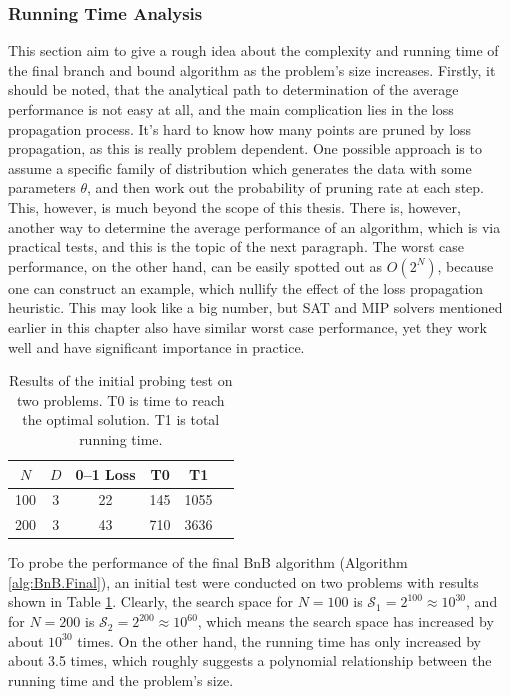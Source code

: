 \subsubsection{Running Time Analysis}
\label{sec:bnb.performance}

This section aim to give a rough idea about the complexity and running time of the final branch and bound algorithm as the problem's size increases. Firstly, it should be noted, that the analytical path to determination of the average performance is not easy at all, and the main complication lies in the loss propagation process. It's hard to know how many points are pruned by loss propagation, as this is really problem dependent. One possible approach is to assume a specific family of distribution which generates the data with some parameters $\theta$, and then work out the probability of pruning rate at each step. This, however, is much beyond the scope of this thesis. There is, however, another way to determine the average performance of an algorithm, which is via practical tests, and this is the topic of the next paragraph. The worst case performance, on the other hand, can be easily spotted out as $O(2^N)$, because one can construct an example, which nullify the effect of the loss propagation heuristic. This may look like a big number, but SAT and MIP solvers mentioned earlier in this chapter also have similar worst case performance, yet they work well and have significant importance in practice.     

\begin{table}[h]
\centering
\begin{tabular}{c  c c c c c}
\hline\hline
$N$ & $D$ & 0--1 Loss & T0 & T1 \\
\hline
100 & 3 & 22 & 145 & 1055 \\
200 & 3 & 43 & 710 & 3636 \\
\hline\hline
\end{tabular}
\caption{Results of the initial probing test on two problems. T0 is time to reach the optimal solution. T1 is total running time.} 
\label{tab:inittest}
\end{table}

To probe the performance of the final BnB algorithm (Algorithm \ref{alg:BnB.Final}), an initial test were conducted on two problems with results shown in Table \ref{tab:inittest}. Clearly, the search space for $N=100$ is $\mathcal{S}_1=2^{100} \approx 10^{30}$, and for $N=200$ is $\mathcal{S}_2=2^{200} \approx 10^{60}$, which means the search space has increased by about $10^{30}$ times. On the other hand, the running time has only increased by about 3.5 times, which roughly suggests a polynomial relationship between the running time and the problem's size. 

